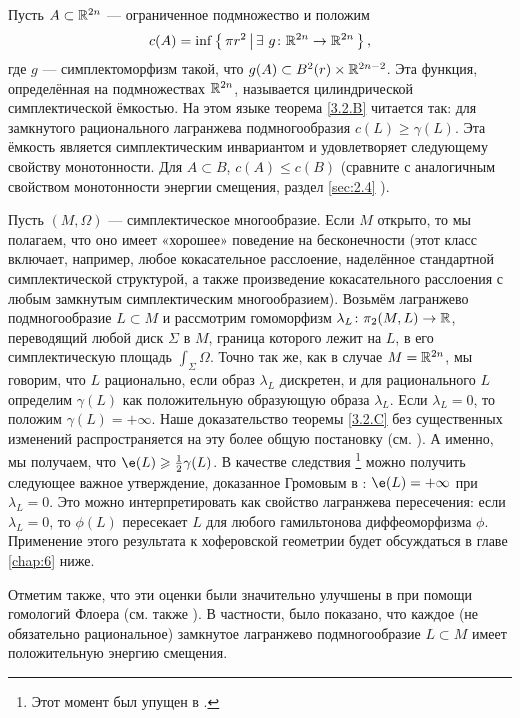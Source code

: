 \begin{ex}{}\label{3.2.F}
Пусть $A \subset \mathbb{R}^{2n}$ --- ограниченное подмножество и положим 
\[c(A) = \inf \left\{ \,{\pi r^2}\, \middle| \,{ \exists\  g\colon \mathbb{R}^{2n} \to \mathbb{R}^{2n}}\, \right\},\]
где $g$ --- симплектоморфизм такой, что $g (A) \subset B^2 (r) \times \mathbb{R}^{2n - 2}$.
Эта функция, определённая на подмножествах $\mathbb{R}^{2n}$, называется цилиндрической симплектической ёмкостью.
На этом языке теорема \ref{3.2.B} читается так:
для замкнутого рационального лагранжева подмногообразия $c(L) \ge \gamma (L)$.
Эта ёмкость является симплектическим инвариантом и удовлетворяет следующему свойству монотонности.
Для $A \subset B$, $c (A) \le c (B)$ (сравните с аналогичным свойством
монотонности энергии смещения, раздел \ref{sec:2.4} ).
\end{ex}



\begin{ex}{}\label{3.2.G}
Пусть $(M, \Omega)$ --- симплектическое многообразие.
Если $M$ открыто, то мы полагаем, что оно имеет «хорошее» поведение на
бесконечности (этот класс включает, например, любое кокасательное
расслоение, наделённое стандартной симплектической структурой, а также
произведение кокасательного расслоения с любым замкнутым
симплектическим многообразием). 
Возьмём лагранжево подмногообразие $L \subset M$ и рассмотрим
гомоморфизм $\lambda_L\colon \pi_2 (M, L) \to \mathbb{R}$, переводящий любой
диск $\Sigma$ в $M$, граница которого лежит на $L$, в его
симплектическую площадь $\int_\Sigma \Omega$. 
Точно так же, как в случае $M = \mathbb{R}^{2n}$, мы говорим, что $L$
рационально, если образ $\lambda_L$ дискретен, и для рационального $L$
определим $\gamma (L)$ как положительную образующую образа
$\lambda_L$. 
Если $\lambda_L = 0$, то положим $\gamma (L) = + \infty$.
Наше доказательство теоремы \ref{3.2.C} без существенных изменений
распространяется на эту более общую постановку (см. \cite{P1}). 
А именно, мы получаем, что $\e (L) \ge \tfrac12 \gamma (L)$.
В качестве следствия%
\footnote{Этот момент был упущен в \cite[с. 359]{P1}.}
можно получить следующее важное утверждение, доказанное Громовым в \cite{G1}:
$\e (L) = + \infty$ при $\lambda_L = 0$.
Это можно интерпретировать как свойство лагранжева пересечения: если $\lambda_L = 0$, то $\phi (L)$ пересекает $L$ для любого гамильтонова диффеоморфизма $\phi$.
Применение этого результата к хоферовской геометрии будет обсуждаться в главе \ref{chap:6} ниже.

Отметим также, что эти оценки были значительно улучшены в \cite{Ch} при помощи гомологий Флоера (см. также \cite{O3}).
В частности, было показано, что каждое (не обязательно рациональное) замкнутое лагранжево подмногообразие $L \subset M$ имеет положительную энергию смещения.
\end{ex}

